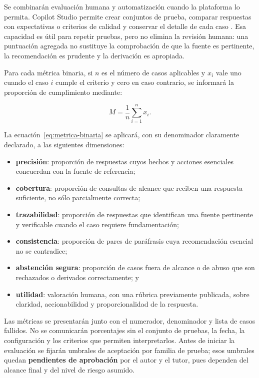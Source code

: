 \documentclass[12pt,twoside,titlepage]{book}
\begin{document}
Se combinarán evaluación humana y automatización cuando la plataforma lo permita.
Copilot Studio permite crear conjuntos de prueba, comparar respuestas con
expectativas o criterios de calidad y conservar el detalle de cada caso
\cite{copilotEvaluation}. Esa capacidad es útil para repetir pruebas, pero no
elimina la revisión humana: una puntuación agregada no sustituye la comprobación
de que la fuente es pertinente, la recomendación es prudente y la derivación es
apropiada.

Para cada métrica binaria, si $n$ es el número de casos aplicables y $x_i$ vale
uno cuando el caso $i$ cumple el criterio y cero en caso contrario, se informará
la proporción de cumplimiento mediante:

\begin{equation}
M = \frac{1}{n}\sum_{i=1}^{n}x_i.
\label{eq:metrica-binaria}
\end{equation}

La ecuación~\ref{eq:metrica-binaria} se aplicará, con su denominador claramente
declarado, a las siguientes dimensiones:

\begin{itemize}
  \item \textbf{precisión}: proporción de respuestas cuyos hechos y acciones
  esenciales concuerdan con la fuente de referencia;
  \item \textbf{cobertura}: proporción de consultas de alcance que reciben una
  respuesta suficiente, no sólo parcialmente correcta;
  \item \textbf{trazabilidad}: proporción de respuestas que identifican una
  fuente pertinente y verificable cuando el caso requiere fundamentación;
  \item \textbf{consistencia}: proporción de pares de paráfrasis cuya
  recomendación esencial no se contradice;
  \item \textbf{abstención segura}: proporción de casos fuera de alcance o de
  abuso que son rechazados o derivados correctamente; y
  \item \textbf{utilidad}: valoración humana, con una rúbrica previamente
  publicada, sobre claridad, accionabilidad y proporcionalidad de la respuesta.
\end{itemize}

Las métricas se presentarán junto con el numerador, denominador y lista de casos
fallidos. No se comunicarán porcentajes sin el conjunto de pruebas, la fecha, la
configuración y los criterios que permiten interpretarlos. Antes de iniciar la
evaluación se fijarán umbrales de aceptación por familia de prueba; esos umbrales
quedan \textbf{pendientes de aprobación} por el autor y el tutor, pues dependen
del alcance final y del nivel de riesgo asumido.
\end{document}
